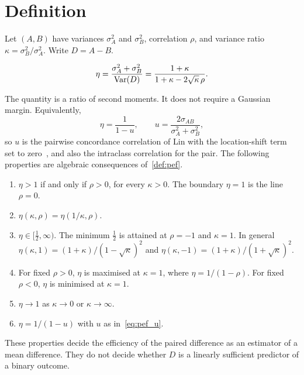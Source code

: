 \section{Definition}
\label{sec:definition}

Let $(A,B)$ have variances $\sigma_A^2$ and $\sigma_B^2$, correlation $\rho$, and variance ratio $\kappa=\sigma_B^2/\sigma_A^2$.
Write $D=A-B$.

\begin{definition}
\label{def:pef}
\[
  \eta
  = \frac{\sigma_A^2+\sigma_B^2}{\operatorname{Var}(D)}
  = \frac{1+\kappa}{1+\kappa-2\sqrt{\kappa}\,\rho}.
\]
\end{definition}

The quantity is a ratio of second moments.
It does not require a Gaussian margin.
Equivalently,
\begin{equation}
  \eta = \frac{1}{1-u},
  \qquad
  u = \frac{2\sigma_{AB}}{\sigma_A^2+\sigma_B^2},
  \label{eq:pef_u}
\end{equation}
so $u$ is the pairwise concordance correlation of Lin with the location-shift term set to zero~\parencite{lin1989}, and also the intraclass correlation for the pair.
The following properties are algebraic consequences of~\cref{def:pef}.

\begin{enumerate}[label=P\arabic*.]
  \item $\eta>1$ if and only if $\rho>0$, for every $\kappa>0$.
        The boundary $\eta=1$ is the line $\rho=0$.
  \item $\eta(\kappa,\rho)=\eta(1/\kappa,\rho)$.
  \item $\eta\in[\tfrac12,\infty)$.
        The minimum $\tfrac12$ is attained at $\rho=-1$ and $\kappa=1$.
        In general $\eta(\kappa,1)=(1+\kappa)/(1-\sqrt{\kappa})^2$ and $\eta(\kappa,-1)=(1+\kappa)/(1+\sqrt{\kappa})^2$.
  \item For fixed $\rho>0$, $\eta$ is maximised at $\kappa=1$, where $\eta=1/(1-\rho)$.
        For fixed $\rho<0$, $\eta$ is minimised at $\kappa=1$.
  \item $\eta\to 1$ as $\kappa\to 0$ or $\kappa\to\infty$.
  \item $\eta=1/(1-u)$ with $u$ as in~\cref{eq:pef_u}.
\end{enumerate}

These properties decide the efficiency of the paired difference as an estimator of a mean difference.
They do not decide whether $D$ is a linearly sufficient predictor of a binary outcome.
